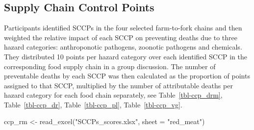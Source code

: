\documentclass[
  letterpaper,
  DIV=11,
  numbers=noendperiod]{scrartcl}
\newenvironment{Shaded}{\begin{snugshade}}{\end{snugshade}}
\newcommand{\AttributeTok}[1]{\textcolor[rgb]{0.40,0.45,0.13}{#1}}
\newcommand{\FunctionTok}[1]{\textcolor[rgb]{0.28,0.35,0.67}{#1}}
\newcommand{\NormalTok}[1]{\textcolor[rgb]{0.00,0.23,0.31}{#1}}
\newcommand{\OtherTok}[1]{\textcolor[rgb]{0.00,0.23,0.31}{#1}}
\newcommand{\StringTok}[1]{\textcolor[rgb]{0.13,0.47,0.30}{#1}}
\begin{document}
\begin{table}

\caption{\label{tbl-deaths}Number of foodborne deaths per year in
Ethiopia by three groups of hazards attributed to four food chains}


\end{table}%

\subsection{Supply Chain Control
Points}\label{supply-chain-control-points}

Participants identified SCCPs in the four selected farm-to-fork chains
and then weighted the relative impact of each SCCP on preventing deaths
due to three hazard categories: anthroponotic pathogens, zoonotic
pathogens and chemicals. They distributed 10 points per hazard category
over each identified SCCP in the corresponding food supply chain in a
group discussion. The number of preventable deaths by each SCCP was then
calculated as the proportion of points assigned to that SCCP, multiplied
by the number of attributable deaths per hazard category for each food
chain separately, see Table~\ref{tbl-ccp_drm}, Table~\ref{tbl-ccp_dr},
Table~\ref{tbl-ccp_pl}, Table~\ref{tbl-ccp_vg}.

\begin{Shaded}
\begin{Highlighting}[]
\NormalTok{ccp\_rm }\OtherTok{\textless{}{-}} \FunctionTok{read\_excel}\NormalTok{(}\StringTok{"SCCPs\_scores.xlsx"}\NormalTok{, }\AttributeTok{sheet =} \StringTok{"red\_meat"}\NormalTok{)}
\end{Highlighting}
\end{Shaded}
\end{document}
